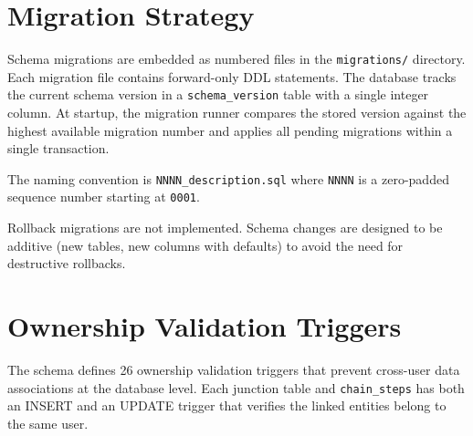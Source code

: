 \documentclass[a4paper, 11pt, oneside]{report}
\begin{document}
\section{Migration Strategy}
\label{sec:migrations}

Schema migrations are embedded as numbered files in the \texttt{migrations/}
directory.  Each migration file contains forward-only DDL statements.  The
database tracks the current schema version in a \texttt{schema\_version}
table with a single integer column.  At startup, the migration runner
compares the stored version against the highest available migration number
and applies all pending migrations within a single transaction.

The naming convention is \texttt{NNNN\_description.sql} where \texttt{NNNN}
is a zero-padded sequence number starting at \texttt{0001}.

Rollback migrations are not implemented.  Schema changes are
designed to be additive (new tables, new columns with defaults) to avoid
the need for destructive rollbacks.

\section{Ownership Validation Triggers}
\label{sec:triggers}

The schema defines 26 ownership validation triggers that prevent cross-user
data associations at the database level.  Each junction table and
\texttt{chain\_steps} has both an INSERT and an UPDATE trigger that verifies
the linked entities belong to the same user.
\end{document}
